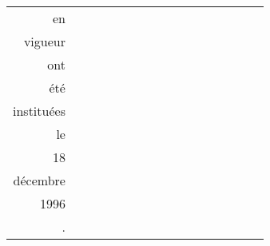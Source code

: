 \documentclass{article}
\begin{document}
\begin{tabular}{r*{15}{|@{}c@{}}|}
en & &&&&&&&&&&&&&& \\
vigueur & &&&&&&&&&&&&&& \\
ont & &&&&&&&&&&&&&& \\
été & &&&&&&&&&&&&&& \\
instituées & &&&&&&&&&&&&&& \\
le & &&&&&&&&&&&&&& \\
18 & &&&&&&&&&&&&&& \\
décembre & &&&&&&&&&&&&&& \\
1996 & &&&&&&&&&&&&&& \\
. & &&&&&&&&&&&&&&\raisebox{-1ex}{\rule{2.8ex}{2.8ex}} \\
\end{tabular}\\\vspace{3em}
\end{document}
